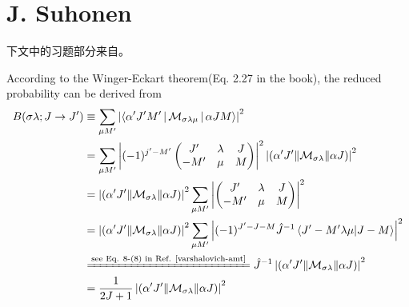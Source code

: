 \section{J. Suhonen}
下文中的习题部分来自\citet{suhonen-NtoN}。
\begin{exercise}
    According to the Winger-Eckart theorem(Eq. 2.27 in the book), 
    the reduced probability can be derived from
    \begin{equation}
    \begin{aligned}
        B(\sigma\lambda; J \rightarrow J^{\prime})
        &\equiv
        \sum_{\mu M^{\prime}} \left|
            \Braket{\alpha^{\prime} J^{\prime} M^{\prime} |
            \mathcal{M}_{\sigma\lambda\mu} | \alpha J M}
        \right|^2 \\
        &= \sum_{\mu M^{\prime}} \left|
        (-1)^{j^{\prime} - M^{\prime}}\begin{pmatrix}
            J^{\prime}  &  \lambda  &  J \\
            -M^{\prime} &  \mu      &  M 
        \end{pmatrix}
        \right|^2 \left|
          \left(\alpha^{\prime} J^{\prime} \| \mathcal{M}_{\sigma\lambda} \|  \alpha J\right)
        \right|^2 \\
        &= \left|
            \left(\alpha^{\prime} J^{\prime} \| \mathcal{M}_{\sigma\lambda} \|  \alpha J\right)
          \right|^2
          \sum_{\mu M^{\prime}} \left|\begin{pmatrix}
            J^{\prime}  &  \lambda  &  J \\
            -M^{\prime} &  \mu      &  M 
        \end{pmatrix}
        \right|^2  \\ 
        &= \left|
            \left(\alpha^{\prime} J^{\prime} \| \mathcal{M}_{\sigma\lambda} \|  \alpha J\right)
          \right|^2
          \sum_{\mu M^{\prime}} \left|
            (-1)^{J^{\prime} - J - M} \hat{J}^{-1}
            \braket{J^{\prime} -M^{\prime} \lambda \mu | J -M}
        \right|^2  \\
        &\xlongequal[]{\text{see Eq. 8-(8) in Ref. \cite{varshalovich-amt}}}
        \hat{J}^{-1} \left|
            \left(\alpha^{\prime} J^{\prime} \| \mathcal{M}_{\sigma\lambda} \|  \alpha J\right)
          \right|^2\\
          &=  \frac{1}{2J+1} \left|
            \left(\alpha^{\prime} J^{\prime} \| \mathcal{M}_{\sigma\lambda} \|  \alpha J\right)
          \right|^2
    \end{aligned}

\end{equation}
\end{exercise}
